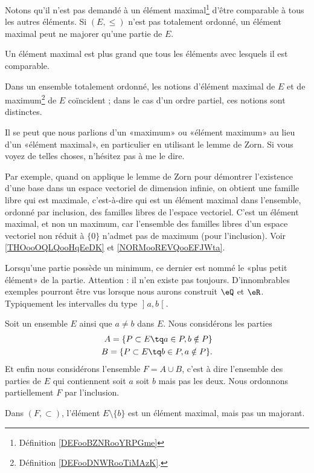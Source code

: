 \begin{normaltext}    \label{NORMooVHIBooJAOsou}
    Notons qu'il n'est pas demandé à un élément maximal\footnote{Définition \ref{DEFooBZNRooYRPGme}} d'être comparable à tous les autres éléments. Si \( (E,\leq)\) n'est pas totalement ordonné, un élément maximal peut ne majorer qu'une partie de \( E\).

    Un élément maximal est plus grand que tous les éléments avec lesquels il est comparable.

    Dans un ensemble totalement ordonné, les notions d'élément maximal de \( E\) et de maximum\footnote{Définition \ref{DEFooDNWRooTiMAzK}.} de \( E\) coïncident ; dans le cas d'un ordre partiel, ces notions sont distinctes.

    Il se peut que nous parlions d'un «maximum» ou «élément maximum»  au lieu d'un «élément maximal», en particulier en utilisant le lemme de Zorn. Si vous voyez de telles choses, n'hésitez pas à me le dire.

    Par exemple, quand on applique le lemme de Zorn pour démontrer l'existence d'une base dans un espace vectoriel de dimension infinie, on obtient une famille libre qui est maximale, c'est-à-dire qui est un élément maximal dans l'ensemble, ordonné par inclusion, des familles libres de l'espace vectoriel. C'est un élément maximal, et non un maximum, car l'ensemble des familles libres d'un espace vectoriel non réduit à \( \{ 0 \}\) n'admet pas de maximum (pour l'inclusion). Voir \ref{THOooOQLQooHqEeDK} et \ref{NORMooREVQooEFJWta}.
\end{normaltext}

Lorsqu'une partie possède un minimum, ce dernier est nommé le «plus petit élément» de la partie. Attention : il n'en existe pas toujours. D'innombrables exemples pourront être vus lorsque nous aurons construit \( \eQ\) et \( \eR\). Typiquement les intervalles du type \( \mathopen] a , b \mathclose[\).

    \begin{example}
    Soit un ensemble \( E\) ainsi que \( a\neq b\) dans \( E\). Nous considérons les parties
    \begin{subequations}
        \begin{align}
            A=\{ P\subset E\tq a\in P,b\notin P \}\\
            B=\{ P\subset E\tq b\in P,a\notin P \}.
        \end{align}
    \end{subequations}
    Et enfin nous considérons l'ensemble \( F=A\cup B\), c'est à dire l'ensemble des parties de \( E\) qui contiennent soit \( a\) soit \( b\) mais pas les deux. Nous ordonnons partiellement \( F\) par l'inclusion.

    Dans \( (F,\subset)\), l'élément \( E\setminus\{ b \}\) est un élément maximal, mais pas un majorant.
\end{example}

